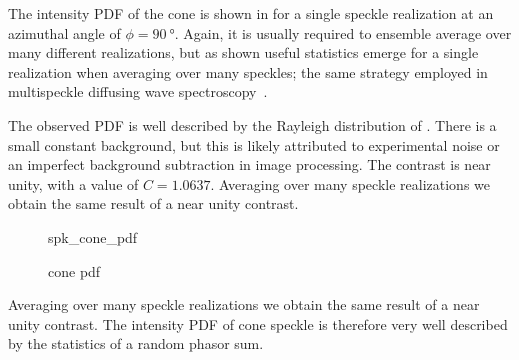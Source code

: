The intensity PDF of the cone is shown in  for a single
speckle realization at an azimuthal angle of $\phi=\SI{90}{\degree}$.
Again, it is usually required to ensemble average over many different
realizations, but as shown useful statistics emerge for a single
realization when averaging over many speckles; the same strategy employed
in multispeckle diffusing wave spectroscopy~\cite{zakharov2006multispeckle}.

The observed PDF is well described by the Rayleigh distribution of
.  There is a small constant background, but this is
likely attributed to experimental noise or an imperfect background
subtraction in image processing.  The contrast is near unity, with a value
of $C=1.0637$.  Averaging over many speckle realizations we obtain the same
result of a near unity contrast.  
\begin{figure}[ht]
\centering
{spk_cone_pdf}
\caption{cone pdf}
\label{fig:conepdf}
\end{figure}

Averaging over many speckle realizations we obtain the same result of a
near unity contrast.  The intensity PDF of cone speckle is therefore very
well described by the statistics of a random phasor sum.
